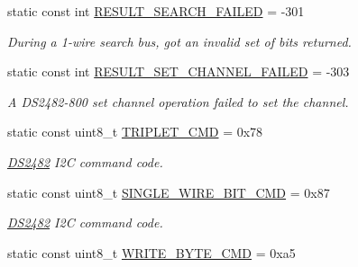 \begin{DoxyCompactItemize}
\mbox{\label{class_d_s2482_command_a1cdbef7fe0719f81be99c61c1e30add8}} 
static const int \mbox{\hyperlink{class_d_s2482_command_a1cdbef7fe0719f81be99c61c1e30add8}{R\+E\+S\+U\+L\+T\+\_\+\+S\+E\+A\+R\+C\+H\+\_\+\+F\+A\+I\+L\+ED}} = -\/301
\begin{DoxyCompactList}\small\item\em During a 1-\/wire search bus, got an invalid set of bits returned. \end{DoxyCompactList}\item 
\mbox{\label{class_d_s2482_command_a720edc489f87ff11c34fdc786857ee29}} 
static const int \mbox{\hyperlink{class_d_s2482_command_a720edc489f87ff11c34fdc786857ee29}{R\+E\+S\+U\+L\+T\+\_\+\+S\+E\+T\+\_\+\+C\+H\+A\+N\+N\+E\+L\+\_\+\+F\+A\+I\+L\+ED}} = -\/303
\begin{DoxyCompactList}\small\item\em A D\+S2482-\/800 set channel operation failed to set the channel. \end{DoxyCompactList}\item 
\mbox{\label{class_d_s2482_command_a5a192d23dad95a26611402a55d9e37f5}} 
static const uint8\+\_\+t \mbox{\hyperlink{class_d_s2482_command_a5a192d23dad95a26611402a55d9e37f5}{T\+R\+I\+P\+L\+E\+T\+\_\+\+C\+MD}} = 0x78
\begin{DoxyCompactList}\small\item\em \mbox{\hyperlink{class_d_s2482}{D\+S2482}} I2C command code. \end{DoxyCompactList}\item 
\mbox{\label{class_d_s2482_command_a8f01be9982737502ef349f739ababdd3}} 
static const uint8\+\_\+t \mbox{\hyperlink{class_d_s2482_command_a8f01be9982737502ef349f739ababdd3}{S\+I\+N\+G\+L\+E\+\_\+W\+I\+R\+E\+\_\+\+B\+I\+T\+\_\+\+C\+MD}} = 0x87
\begin{DoxyCompactList}\small\item\em \mbox{\hyperlink{class_d_s2482}{D\+S2482}} I2C command code. \end{DoxyCompactList}\item 
\mbox{\label{class_d_s2482_command_ad41007ba69370aa9a3d0982b7bebdb97}} 
static const uint8\+\_\+t \mbox{\hyperlink{class_d_s2482_command_ad41007ba69370aa9a3d0982b7bebdb97}{W\+R\+I\+T\+E\+\_\+\+B\+Y\+T\+E\+\_\+\+C\+MD}} = 0xa5

\end{DoxyCompactItemize}
